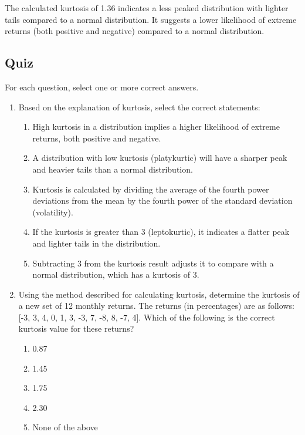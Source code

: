 \documentclass{article}
\begin{document}
The calculated kurtosis of 1.36 indicates a less peaked distribution with lighter tails compared to a normal distribution. It suggests a lower likelihood of extreme returns (both positive and negative) compared to a normal distribution.

\subsection{Quiz}
For each question, select one or more correct answers.

\begin{enumerate}
    \item Based on the explanation of kurtosis, select the correct statements:
        \begin{enumerate}
            \item High kurtosis in a distribution implies a higher likelihood of extreme returns, both positive and negative.
            \item A distribution with low kurtosis (platykurtic) will have a sharper peak and heavier tails than a normal distribution.
            \item Kurtosis is calculated by dividing the average of the fourth power deviations from the mean by the fourth power of the standard deviation (volatility).
            \item If the kurtosis is greater than 3 (leptokurtic), it indicates a flatter peak and lighter tails in the distribution.
            \item Subtracting 3 from the kurtosis result adjusts it to compare with a normal distribution, which has a kurtosis of 3.
        \end{enumerate}

    \item Using the method described for calculating kurtosis, determine the kurtosis of a new set of 12 monthly returns. The returns (in percentages) are as follows: [-3, 3, 4, 0, 1, 3, -3, 7, -8, 8, -7, 4]. Which of the following is the correct kurtosis value for these returns?
        \begin{enumerate}
            \item 0.87
            \item 1.45
            \item 1.75
            \item 2.30
            \item None of the above
        \end{enumerate}

\end{enumerate}
\end{document}
